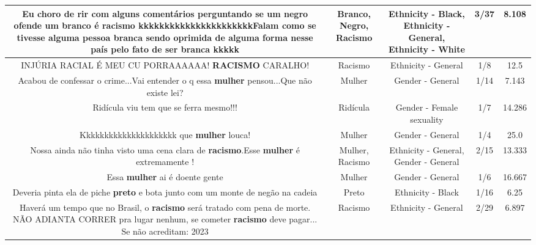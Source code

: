\documentclass[11pt]{article}
\newlength\mylength
\begin{document}
\begin{center}
\begin{longtable}{|C{.65\mylength}|C{.30\mylength}|C{.12\mylength}|C{.12\mylength}|C{.12\mylength}|}
  \small Eu choro de rir com alguns comentários perguntando se um \textbf{negro} ofende um \textbf{branco} é \textbf{racismo} kkkkkkkkkkkkkkkkkkkkkkFalam como se tivesse alguma pessoa branca sendo oprimida de alguma forma nesse país pelo fato de ser branca kkkkk\normalsize   & Branco, Negro, Racismo & Ethnicity - Black, Ethnicity - General, Ethnicity - White & 3/37 & 8.108 \\  \hline
  \small INJÚRIA RACIAL É MEU CU PORRAAAAAA! \textbf{RACISMO} CARALHO!\normalsize   & Racismo & Ethnicity - General & 1/8 & 12.5 \\  \hline
  \small Acabou de confessar o crime...Vai entender o q essa \textbf{mulher} pensou...Que não existe lei?\normalsize   & Mulher & Gender - General & 1/14 & 7.143 \\  \hline
  \small Ridícula viu tem que se ferra mesmo!!!\normalsize   & Ridícula & Gender - Female sexuality & 1/7 & 14.286 \\  \hline
  \small Kkkkkkkkkkkkkkkkkkkkk que \textbf{mulher} louca!\normalsize   & Mulher & Gender - General & 1/4 & 25.0 \\  \hline
  \small Nossa ainda não tinha visto uma cena clara de \textbf{racismo}.Esse \textbf{mulher} é extremamente !\normalsize   & Mulher, Racismo & Ethnicity - General, Gender - General & 2/15 & 13.333 \\  \hline
  \small Essa \textbf{mulher}  ai é doente gente\normalsize   & Mulher & Gender - General & 1/6 & 16.667 \\  \hline
  \small Deveria pinta ela de piche \textbf{preto} e bota junto com um monte de negão na cadeia\normalsize   & Preto & Ethnicity - Black & 1/16 & 6.25 \\  \hline
  \small Haverá um tempo que no Brasil, o \textbf{racismo} será tratado com pena de morte. NÃO ADIANTA CORRER pra lugar nenhum, se cometer \textbf{racismo} deve pagar... Se não acreditam: 2023\normalsize   & Racismo & Ethnicity - General & 2/29 & 6.897 \\  \hline

\end{longtable}
\end{center}
\end{document}
